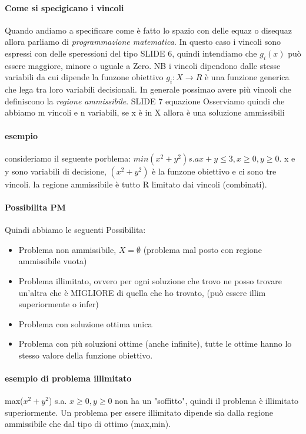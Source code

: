 \documentclass[12pt, a4paper, openany]{book}
\begin{document}
\paragraph*{Come si specigicano i vincoli} Quando andiamo a specificare come è fatto lo spazio con delle equaz o disequaz allora parliamo di \emph{programmazione matematica}.
In questo caso i vincoli sono espressi con delle speressioni del tipo {SLIDE 6}, quindi intendiamo che $g_i(x)$ può essere maggiore, minore o uguale a Zero. NB i vincoli dipendono dalle stesse variabili da cui dipende la funzone obiettivo 
$g_i :X\to R$ è una funzione generica che lega tra loro variabili decisionali. In generale possimao avere più vincoli che definiscono la \emph{regione ammissibile}.
{SLIDE 7 equazione }Osserviamo quindi che abbiamo m vincoli e n variabili, se x è in X allora è una soluzione ammissibili
\paragraph*{esempio} consideriamo il seguente porblema: $min (x^2+y^2) s.a x+y\leq 3, x\geq 0, y\geq0$. 
x e y sono variabili di decisione, $(x^2+y^2)$ è la funzone obiettivo e ci sono tre vincoli. la regione ammissibile è tutto R limitato dai vincoli (combinati).
\paragraph*{Possibilita PM} Quindi abbiamo le seguenti Possibilita:
\begin{itemize}
    \item Problema non ammissibile, $X = \emptyset$ (problema mal posto con regione ammissibile vuota)
    \item Problema illimitato, ovvero per ogni soluzione che trovo ne posso trovare un'altra che è MIGLIORE di quella che ho trovato, (può essere illim superiormente o infer)
    \item Problema con soluzione ottima unica
    \item Problema con più soluzioni ottime (anche infinite), tutte le ottime hanno lo stesso valore della funzione obiettivo.
\end{itemize}
\paragraph*{esempio di problema illimitato } max($x^2+y^2$) s.a. $x\geq 0,y\geq 0$ non ha un "soffitto", quindi il problema è illimitato superiormente. Un problema per essere illimitato dipende sia dalla regione ammissibile che dal tipo di ottimo (max,min).
\end{document}
